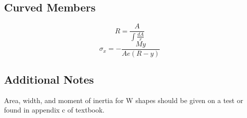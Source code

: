 \documentclass[10pt,landscape]{article}
\newenvironment{Figure}
     {\par\medskip\noindent\minipage{\linewidth}}
     {\endminipage\par\medskip}
\begin{document}
\begin{multicols}{3}
\subsection{Curved Members}
\begin{equation}
    R=\frac{A}{\int\frac{dA}{r}}
\end{equation}
\begin{equation}
    \sigma_x=-\frac{My}{Ae(R-y)}
\end{equation}
\subsection{Additional Notes}
Area, width, and moment of inertia for W shapes should be given on a test or found in appendix c of textbook.












%
%

\end{multicols}
\end{document}
